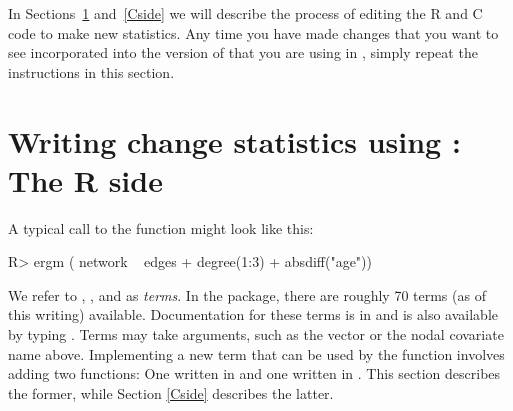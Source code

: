 \documentclass[article]{jss}
\begin{document}
In Sections~\ref{Rside} and~\ref{Cside} we will describe the process of editing the R and C code to make new statistics.  Any time you have made changes that you want to see incorporated into the version of  that you are using in , simply repeat the instructions in this section.

\section[Writing change statistics using ergmuserterms:  The R side]%
{Writing change statistics using :  The R side}
\label{Rside}

A typical call to the  function might look like this:
\begin{CodeChunk}
\begin{CodeInput}
R> ergm ( network ~ edges + degree(1:3) + absdiff("age"))
\end{CodeInput}
\end{CodeChunk}
We refer to , , and  as {\em terms}.
In the  package, there are roughly 70 terms (as of this writing) available.
Documentation for these terms is
 in \citet{ergmtermsjss} and is also available by typing .
 Terms may take arguments, such as the vector  or the nodal covariate
 name  above.  Implementing a new term that can be used by
 the  function involves adding two functions:  One written in 
 and one written in .  This section describes the former, while Section \ref{Cside}
 describes the latter.
 
\end{document}

